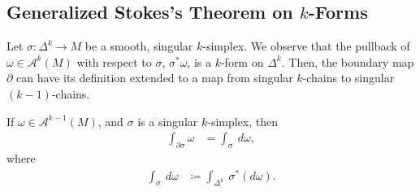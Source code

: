 \documentclass[10pt]{mypackage}
\begin{document}
\subsection{Generalized Stokes's Theorem on $k$-Forms}%
Let $\sigma\colon \Delta^{k}\rightarrow M$ be a smooth, singular $k$-simplex. We observe that the pullback of $\omega\in \mathcal{A}^{k}\left( M \right)$ with respect to $\sigma$, $\sigma^{\ast}\omega$, is a $k$-form on $\Delta^{k}$. Then, the boundary map $\partial$ can have its definition extended to a map from singular $k$-chains to singular $\left( k-1 \right)$-chains.
\begin{theorem}
  If $\omega\in \mathcal{A}^{k-1}\left( M \right)$, and $\sigma$ is a singular $k$-simplex, then
  \begin{align*}
    \int_{\partial \sigma}^{} \omega &= \int_{\sigma}^{} \:d\omega,
  \end{align*}
  where
  \begin{align*}
    \int_{\sigma}^{} \:d\omega &\coloneq \int_{\Delta^{k}}^{} \:\sigma^{\ast}\left( d\omega \right).
  \end{align*}
\end{theorem}
\end{document}
